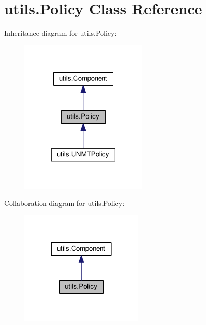 \hypertarget{classutils_1_1Policy}{}\section{utils.\+Policy Class Reference}
\label{classutils_1_1Policy}


Inheritance diagram for utils.\+Policy\+:
\nopagebreak
\begin{figure}[H]
\begin{center}
\leavevmode
\includegraphics[width=174pt]{classutils_1_1Policy__inherit__graph}
\end{center}
\end{figure}


Collaboration diagram for utils.\+Policy\+:
\nopagebreak
\begin{figure}[H]
\begin{center}
\leavevmode
\includegraphics[width=168pt]{classutils_1_1Policy__coll__graph}
\end{center}
\end{figure}
